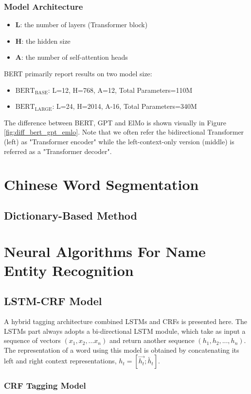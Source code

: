 \documentclass[a3paper, 12pt]{book} %
\newcommand\bolden[1]{{\boldmath\bfseries#1}}
\begin{document}
\subsection{Model Architecture}
\begin{itemize}
	\item \textbf{L}: the number of layers (Transformer block)
	\item \textbf{H}: the hidden size 
	\item \textbf{A}: the number of self-attention heads
\end{itemize}
BERT primarily report results on two model size:
\begin{itemize}
	\item \bolden{$\text{BERT}_{\text{BASE}}$}: L=12, H=768, A=12, Total Parameters=110M
	\item \bolden{$\text{BERT}_{\text{LARGE}}$}: L=24, H=2014, A-16, Total Parameters=340M
\end{itemize}
The difference between BERT, GPT and ElMo is shown visually in Figure \ref{fig:diff_bert_gpt_emlo}. Note that we often refer the bidirectional Transformer (left) as "Transformer encoder" while the left-context-only version (middle) is referred as a "Transformer decoder".

\chapter{Chinese Word Segmentation}
\section{Dictionary-Based Method}

\chapter{Neural Algorithms For Name Entity Recognition}
\section{LSTM-CRF Model}
A hybrid tagging architecture combined LSTMs and CRFs is presented here. The LSTMs part always adopts a bi-directional LSTM module, which take as input a sequence of vectors $(x_1, x_2,...x_n)$ and return another sequence $(h_1,h_2,...,h_n)$. The representation of a word using this model is obtained by concatenating its left and right context representations, $h_t=[\overrightarrow{h_t};\overleftarrow{h_t}]$.

\subsection{CRF Tagging Model}
\end{document}
